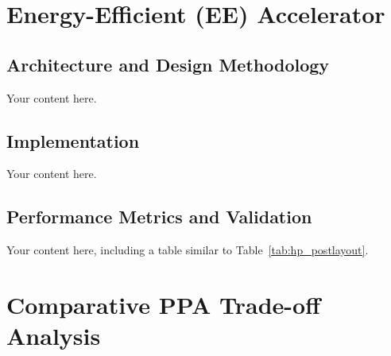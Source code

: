\documentclass[conference]{IEEEtran}
\begin{document}
\section{\textcolor{eecolor}{Energy-Efficient (EE) Accelerator}}\label{sec:ee}

\subsection{Architecture and Design Methodology}\label{sec:ee:arch}

{\color{eecolor}Your content here.}

\subsection{Implementation}\label{sec:ee:impl}

{\color{eecolor}Your content here.}

\subsection{Performance Metrics and Validation}\label{sec:ee:verif}

{\color{eecolor}Your content here, including a table similar to Table~\ref{tab:hp_postlayout}.}


\section{Comparative PPA Trade-off Analysis}\label{sec:ppa}
\end{document}

